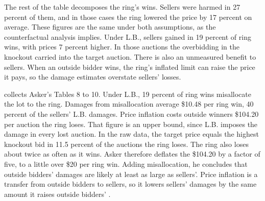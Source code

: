 The rest of the table decomposes the ring's wins. Sellers were harmed in 27 percent of them, and in those cases
the ring lowered the price by 17 percent on average. These figures are the same under both assumptions, as the
counterfactual analysis implies. Under L.B., sellers gained in 19 percent of ring wins, with prices 7 percent
higher. In those auctions the overbidding in the knockout carried into the target auction. There is also an
unmeasured benefit to sellers. When an outside bidder wins, the ring's inflated limit can raise the price it pays,
so the damage estimates overstate sellers' losses.

 collects Asker's Tables 8 to 10. Under L.B., 19 percent of ring wins misallocate the lot
to the ring. Damages from misallocation average \$10.48 per ring win, 40 percent of the sellers' L.B. damages.
Price inflation costs outside winners \$104.20 per auction the ring loses. That figure is an upper bound, since
L.B. imposes the damage in every lost auction. In the raw data, the target price equals the highest knockout bid
in 11.5 percent of the auctions the ring loses. The ring also loses about twice as often as it wins. Asker
therefore deflates the \$104.20 by a factor of five, to a little over \$20 per ring win. Adding misallocation, he
concludes that outside bidders' damages are likely at least as large as sellers'. Price inflation is a transfer
from outside bidders to sellers, so it lowers sellers' damages by the same amount it raises outside bidders'
\citep[pp.~753--754]{Asker2010}.

